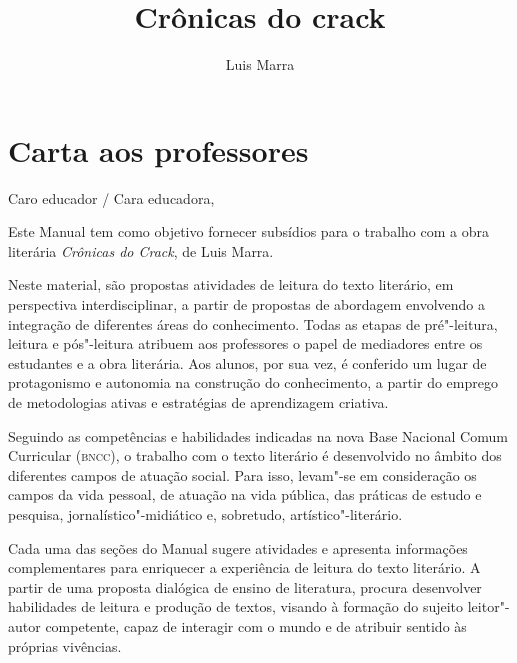 \documentclass{article}
\begin{document}
\newcommand{\AutorLivro}{Luis Marra}
\newcommand{\TituloLivro}{Crônicas do crack}
\newcommand{\Tema}{Diálogos com a sociologia e com a antropologia}
\newcommand{\Genero}{Conto, crônica e novela}
\newcommand{\issnppub}{---}
\newcommand{\issnepub}{---}
\newcommand{\colaborador}{\textbf{Eduardo Modesto de Carvalho, Bruno Gradella e Vicente Castro} é uma pessoa incrível e vai fazer um bom serviço.}


\title{\TituloLivro}
\author{\AutorLivro}
\def\authornotes{\colaborador}

\date{}
\maketitle
\tableofcontents

\pagebreak

\section{Carta aos professores}

Caro educador / Cara educadora,\\\bigskip

Este Manual tem como objetivo fornecer subsídios para o trabalho com a
obra literária \emph{Crônicas do Crack}, de Luis Marra.

Neste material, são propostas atividades de leitura do texto literário,
em perspectiva interdisciplinar, a partir de propostas de abordagem
envolvendo a integração de diferentes áreas do conhecimento. Todas as
etapas de pré"-leitura, leitura e pós"-leitura atribuem aos professores o
papel de mediadores entre os estudantes e a obra literária. Aos alunos,
por sua vez, é conferido um lugar de protagonismo e autonomia na
construção do conhecimento, a partir do emprego de metodologias ativas e
estratégias de aprendizagem criativa.

Seguindo as competências e habilidades indicadas na nova Base Nacional
Comum Curricular (\textsc{bncc}), o trabalho com o texto literário é desenvolvido
no âmbito dos diferentes campos de atuação social. Para isso, levam"-se
em consideração os campos da vida pessoal, de atuação na vida pública,
das práticas de estudo e pesquisa, jornalístico"-midiático e, sobretudo,
artístico"-literário.

Cada uma das seções do Manual sugere atividades e apresenta informações
complementares para enriquecer a experiência de leitura do texto
literário. A partir de uma proposta dialógica de ensino de literatura,
procura desenvolver habilidades de leitura e produção de textos, visando
à formação do sujeito leitor"-autor competente, capaz de interagir com o
mundo e de atribuir sentido às próprias vivências.
\end{document}
